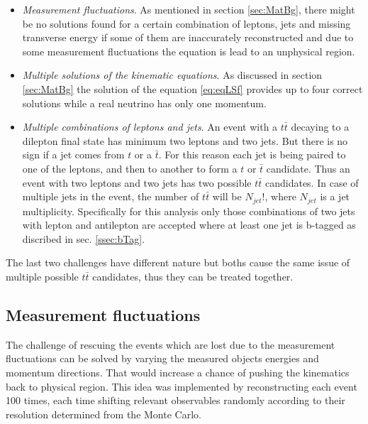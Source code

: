\begin{itemize}
 \item \textit{Measurement fluctuations}. As mentioned in section \ref{sec:MatBg}, there might be no solutions found for a certain combination
 of leptons, jets and missing transverse energy if some of them are inaccurately reconstructed and due to some measurement fluctuations the equation
 is lead to an unphysical region.
 \item \textit{Multiple solutions of the kinematic equations}. As discussed in section \ref{sec:MatBg} the solution of the equation \ref{eq:eqLSf}
 provides up to four correct solutions while a real neutrino has only one momentum.
 \item \textit{Multiple combinations of leptons and jets}. An event with a $t\bar{t}$ decaying to a dilepton final state has minimum two leptons and two
 jets. But there is no sign if a jet comes from $t$ or a $\bar{t}$. For this reason each jet is being paired to one of the leptons, and then to another
 to form a $t$ or $\bar{t}$ candidate. Thus an event with two leptons and two jets has two possible $t\bar{t}$ candidates. In case of multiple jets
 in the event, the number of $t\bar{t}$ will be $N_{jet}!$, where $N_{jet}$ is a jet multiplicity. Specifically for this analysis only those combinations 
 of two jets with lepton and antilepton are accepted where at least one jet is b-tagged as discribed in sec. \ref{ssec:bTag}.
\end{itemize}

The last two challenges have different nature but boths cause the same issue of multiple possible $t\bar{t}$ candidates, thus they can be treated together.

\subsection{Measurement fluctuations}

The challenge of rescuing the events which are lost due to the measurement fluctuations can be solved by varying the measured objects energies and
momentum directions. That would increase a chance of pushing the kinematics back to physical region. This idea was implemented by reconstructing
each event 100 times, each time shifting relevant observables randomly according to their resolution determined from the Monte Carlo.

